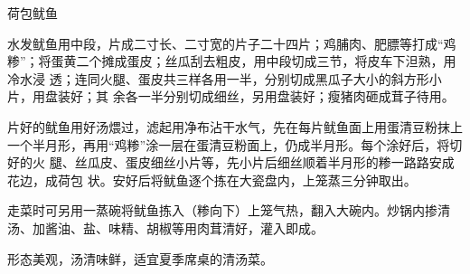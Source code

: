 \begin{recipe}{荷包鱿鱼}

\ingredients


\preparation

\step 水发鱿鱼用中段，片成二寸长、二寸宽的片子二十四片；鸡脯肉、肥膘等打成“鸡
糁”；将蛋黄二个摊成蛋皮；丝瓜刮去粗皮，用中段切成三节，将皮车下泹熟，用冷水浸
透；连同火腿、蛋皮共三样各用一半，分别切成黑瓜子大小的斜方形小片，用盘装好；其
余各一半分别切成细丝，另用盘装好；瘦猪肉砸成茸子待用。

\step 片好的鱿鱼用好汤煨过，滤起用净布沾干水气，先在每片鱿鱼面上用蛋清豆粉抹上
一个半月形，再用“鸡糁”涂一层在蛋清豆粉面上，仍成半月形。每个涂好后，将切好的火
腿、丝瓜皮、蛋皮细丝小片等，先小片后细丝顺着半月形的糁一路路安成花边，成荷包
状。安好后将鱿鱼逐个拣在大瓷盘内，上笼蒸三分钟取出。

\step 走菜时可另用一蒸碗将鱿鱼拣入（糁向下）上笼气热，翻入大碗内。炒锅内掺清
汤、加酱油、盐、味精、胡椒等用肉茸清好，灌入即成。

\features

形态美观，汤清味鲜，适宜夏季席桌的清汤菜。

\end{recipe}

